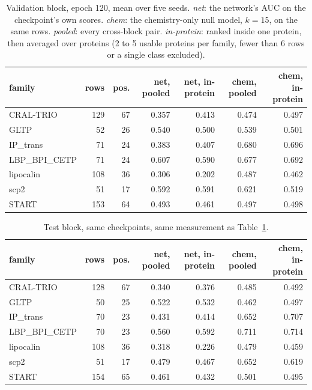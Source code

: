 \begin{table}[htbp]
\centering
\begin{tabular}{lrrrrrr}
\hline
family & rows & pos. & net, pooled & net, in-protein & chem, pooled & chem, in-protein \\
\hline
CRAL-TRIO & 129 & 67 & 0.357 & 0.413 & 0.474 & 0.497 \\
GLTP & 52 & 26 & 0.540 & 0.500 & 0.539 & 0.501 \\
IP\_trans & 71 & 24 & 0.383 & 0.407 & 0.680 & 0.696 \\
LBP\_BPI\_CETP & 71 & 24 & 0.607 & 0.590 & 0.677 & 0.692 \\
lipocalin & 108 & 36 & 0.306 & 0.202 & 0.487 & 0.462 \\
scp2 & 51 & 17 & 0.592 & 0.591 & 0.621 & 0.519 \\
START & 153 & 64 & 0.493 & 0.461 & 0.497 & 0.498 \\
\hline
\end{tabular}
\caption{Validation block, epoch 120, mean over five seeds. \emph{net}: the network's AUC
on the checkpoint's own scores. \emph{chem}: the chemistry-only null model, $k=15$, on the
same rows. \emph{pooled}: every cross-block pair. \emph{in-protein}: ranked inside one
protein, then averaged over proteins (2 to 5 usable proteins per family, fewer than 6
rows or a single class excluded).}
\label{tab:randaucvalid}
\end{table}

\begin{table}[htbp]
\centering
\begin{tabular}{lrrrrrr}
\hline
family & rows & pos. & net, pooled & net, in-protein & chem, pooled & chem, in-protein \\
\hline
CRAL-TRIO & 128 & 67 & 0.340 & 0.376 & 0.485 & 0.492 \\
GLTP & 50 & 25 & 0.522 & 0.532 & 0.462 & 0.497 \\
IP\_trans & 70 & 23 & 0.431 & 0.414 & 0.652 & 0.707 \\
LBP\_BPI\_CETP & 70 & 23 & 0.560 & 0.592 & 0.711 & 0.714 \\
lipocalin & 108 & 36 & 0.318 & 0.226 & 0.479 & 0.459 \\
scp2 & 51 & 17 & 0.479 & 0.467 & 0.652 & 0.619 \\
START & 154 & 65 & 0.461 & 0.432 & 0.501 & 0.495 \\
\hline
\end{tabular}
\caption{Test block, same checkpoints, same measurement as Table~\ref{tab:randaucvalid}.}
\label{tab:randauctest}
\end{table}

